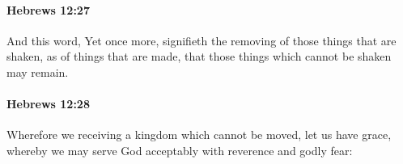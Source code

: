 		\paragraph{Hebrews 12:27} %
			\label{HEBREWS-12-27}

			And this word, Yet once more, signifieth the removing of those things that are shaken, as of things that are made, that those things which cannot be shaken may remain.

			\begin{framed}
			\scriptsize
				\begin{compactdesc}
					\item[SBLG] 
				\end{compactdesc}
			\end{framed}

		\paragraph{Hebrews 12:28} %
			\label{HEBREWS-12-28}

			Wherefore we receiving a kingdom which cannot be moved, let us have grace, whereby we may serve God acceptably with reverence and godly fear:

